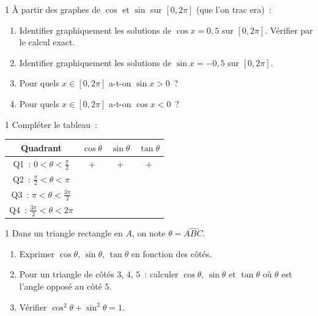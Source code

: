 \begin{exo}{1}
\`A partir des graphes de $\cos$ et $\sin$ sur $[0,2\pi]$
(que l'on trac era)~:
\begin{enumerate}
  \item Identifier graphiquement les solutions de $\cos x = 0{,}5$
        sur $[0,2\pi]$. V\'erifier par le calcul exact.
  \item Identifier graphiquement les solutions de $\sin x = -0{,}5$
        sur $[0,2\pi]$.
  \item Pour quels $x\in[0,2\pi]$ a-t-on $\sin x > 0$~?
  \item Pour quels $x\in[0,2\pi]$ a-t-on $\cos x < 0$~?
\end{enumerate}
\end{exo}

\begin{exo}{1}
Compl\'eter le tableau~:
\begin{center}
\renewcommand{\arraystretch}{1.4}
\begin{tabular}{|c|c|c|c|}
\hline
\rowcolor{BN!10}
Quadrant & $\cos\theta$ & $\sin\theta$ & $\tan\theta$ \\
\hline
Q1~: $0<\theta<\frac{\pi}{2}$ & $+$ & $+$ & $+$ \\
Q2~: $\frac{\pi}{2}<\theta<\pi$ & & & \\
Q3~: $\pi<\theta<\frac{3\pi}{2}$ & & & \\
Q4~: $\frac{3\pi}{2}<\theta<2\pi$ & & & \\
\hline
\end{tabular}
\end{center}
\end{exo}

\begin{exo}{1}
Dans un triangle rectangle en $A$, on note $\theta = \widehat{ABC}$.
\begin{enumerate}
  \item Exprimer $\cos\theta$, $\sin\theta$, $\tan\theta$ en fonction des c\^ot\'es.
  \item Pour un triangle de c\^ot\'es $3$, $4$, $5$~:
        calculer $\cos\theta$, $\sin\theta$ et $\tan\theta$ o\`u $\theta$
        est l'angle oppos\'e au c\^ot\'e $5$.
  \item V\'erifier $\cos^2\theta+\sin^2\theta=1$.
\end{enumerate}
\end{exo}

